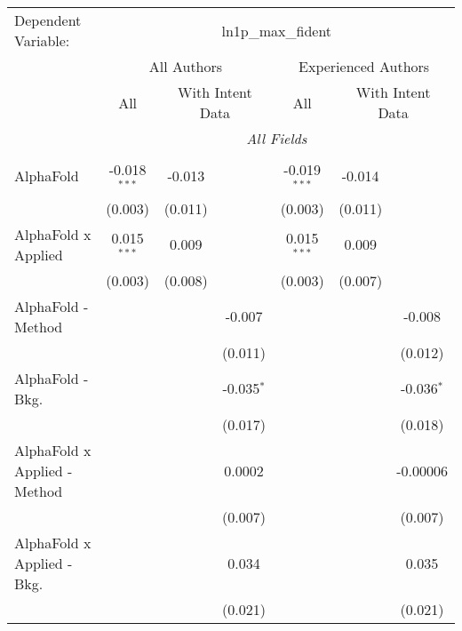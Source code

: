 \begingroup
\centering
\begin{tabular}{lcccccc}
   \tabularnewline \midrule \midrule
   Dependent Variable: & \multicolumn{6}{c}{ln1p\_max\_fident}\\
 & \multicolumn{3}{c}{All Authors} & \multicolumn{3}{c}{Experienced Authors} \\
\cmidrule(lr){2-4} \cmidrule(lr){5-7}
 & \multicolumn{1}{c}{All} & \multicolumn{2}{c}{With Intent Data} & \multicolumn{1}{c}{All} & \multicolumn{2}{c}{With Intent Data} \\
\cmidrule(lr){2-2} \cmidrule(lr){3-4} \cmidrule(lr){5-5} \cmidrule(lr){6-7}
 & \multicolumn{6}{c}{\textit{All Fields}} \\ \\
   AlphaFold                      & -0.018$^{***}$ & -0.013  &                & -0.019$^{***}$ & -0.014  &   \\   
                                  & (0.003)        & (0.011) &                & (0.003)        & (0.011) &   \\   
   AlphaFold x Applied            & 0.015$^{***}$  & 0.009   &                & 0.015$^{***}$  & 0.009   &   \\   
                                  & (0.003)        & (0.008) &                & (0.003)        & (0.007) &   \\   
   AlphaFold - Method             &                &         & -0.007         &                &         & -0.008\\   
                                  &                &         & (0.011)        &                &         & (0.012)\\   
   AlphaFold - Bkg.               &                &         & -0.035$^{*}$   &                &         & -0.036$^{*}$\\   
                                  &                &         & (0.017)        &                &         & (0.018)\\   
   AlphaFold x Applied - Method   &                &         & 0.0002         &                &         & -0.00006\\   
                                  &                &         & (0.007)        &                &         & (0.007)\\   
   AlphaFold x Applied - Bkg.     &                &         & 0.034          &                &         & 0.035\\   
                                  &                &         & (0.021)        &                &         & (0.021)\\   

\end{tabular}
